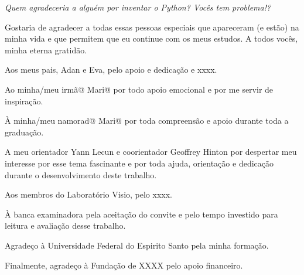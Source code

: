 \fi
\begin{dedicatoria}
   \vspace*{\fill}
   \centering
   \noindent
   \textit{Quem agradeceria a alguém por inventar o Python? Vocês tem problema!?
   } \vspace*{\fill}
\end{dedicatoria}


\begin{agradecimentos}

Gostaria de agradecer a todas essas pessoas especiais que apareceram (e estão) na minha vida e que permitem que eu continue com os meus estudos. A todos vocês, minha eterna gratidão.

Aos meus pais, Adan e Eva, pelo apoio e dedicação e xxxx.
    
Ao minha/meu irmã@ Mari@ por todo apoio emocional e por me servir de inspiração.

À minha/meu namorad@ Mari@ por toda compreensão e apoio durante toda a graduação.
    	
A meu orientador Yann Lecun e coorientador Geoffrey Hinton por despertar meu interesse por esse tema fascinante e por toda ajuda, orientação e dedicação durante o desenvolvimento deste trabalho.

Aos membros do Laboratório Visio, pelo xxxx.

À banca examinadora pela aceitação do convite e pelo tempo investido para leitura e avaliação desse trabalho.

Agradeço à Universidade Federal do Espirito Santo pela minha formação. 

Finalmente, agradeço à Fundação de XXXX pelo apoio financeiro.
\end{agradecimentos}



